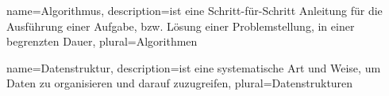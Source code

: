 {
	name={Algorithmus},
	description={ist eine Schritt-für-Schritt Anleitung für die Ausführung einer Aufgabe, bzw. Lösung einer Problemstellung, in einer begrenzten Dauer},
	plural={Algorithmen}	
}

{
	name={Datenstruktur},
	description={ist eine systematische Art und Weise, um Daten zu organisieren und darauf zuzugreifen},
	plural={Datenstrukturen}	
}